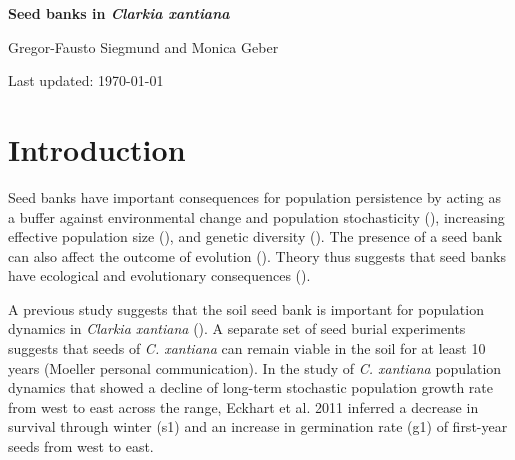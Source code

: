 \documentclass[12pt, oneside, titlepage]{article}   	%
\begin{document}
\begin{titlepage}
   \begin{center}
       \vspace*{1cm}
 
       \textbf{Seed banks in \textit{Clarkia xantiana}}
 
       \vspace{1.5cm}
 
       Gregor-Fausto Siegmund and Monica Geber
 
   	Last updated: \today
 
   \end{center}
\end{titlepage}
%


 


\section*{Introduction}

Seed banks have important consequences for population persistence by acting as a buffer against environmental change and population stochasticity (\cite{eager2014,paniw2017}), increasing effective population size (\cite{nunney2002,waples2006}), and genetic diversity (\cite{mccue1998b}). The presence of a seed bank can also affect the outcome of evolution (\cite{heinrich2018,ritland1983}). Theory thus suggests that seed banks have ecological and evolutionary consequences (\cite{evans2005}). 

A previous study suggests that the soil seed bank is important for population dynamics in \textit{Clarkia xantiana} (\cite{eckhart2011}). A separate set of seed burial experiments suggests that seeds of \textit{C. xantiana} can remain viable in the soil for at least 10 years (Moeller personal communication). In the study of \textit{C. xantiana} population dynamics that showed a decline of long-term stochastic population growth rate from west to east across the range, Eckhart et al. 2011 inferred a decrease in survival through winter (s1) and an increase in germination rate (g1) of first-year seeds from west to east.

\end{document}
